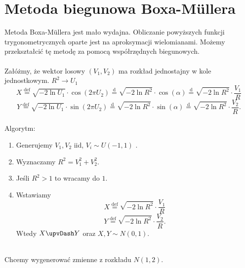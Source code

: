 \documentclass[12pt]{mwart}
\begin{document}
	
	\section{Metoda biegunowa Boxa-Müllera}
	\noindent Metoda Boxa-Müllera jest mało wydajna. Obliczanie powyższych funkcji trygonometrycznych oparte jest na aproksymacji wielomianami. Możemy przekształcić tę metodę za pomocą współrzędnych biegunowych. \\ \\
	\noindent Załóżmy, że wektor losowy $\left( V_{1},V_{2} \right) $ ma rozkład jednostajny w kole jednostkowym.
	$R^{2} \rightarrow U_{1}$
	$$X \overset{\mathrm{def}}{=} \sqrt{-2\ln{U_{1}}} \cdot \cos{\left( 2\pi U_{2} \right) } \overset{\mathrm{d}}{=} \sqrt{-2\ln{R^{2}}} \cdot \cos{\left( \alpha \right) }  \overset{\mathrm{d}}{=} \sqrt{-2\ln{R^{2}}} \cdot \dfrac{V_{1}}{R} $$ 
	$$Y \overset{\mathrm{def}}{=} \sqrt{-2\ln{U_{1}}} \cdot \sin{\left( 2\pi U_{2} \right) \overset{\mathrm{d}}{=} \sqrt{-2\ln{R^{2}}} \cdot \sin{\left( \alpha \right) }  \overset{\mathrm{d}}{=} \sqrt{-2\ln{R^{2}}} \cdot \dfrac{V_{2}}{R}}.$$ \\
	
	\noindent Algorytm:
	\begin{enumerate}
		\item Generujemy $V_{1}, V_{2}$ iid, $V_{i } \sim U \left( -1,1 \right)$ .
		\item Wyznaczamy $R^{2}=V_{1}^{2} + V_{2}^{2}$.
		\item Jeśli $R^{2}>1$ to wracamy do $1$. 
		\item Wstawiamy
		$$X \overset{\mathrm{def}}{=} \sqrt{-2\ln{R^{2}}} \cdot \dfrac{V_{1}}{R}$$ 
		$$Y \overset{\mathrm{def}}{=} \sqrt{-2\ln{R^{2}}} \cdot \dfrac{V_{2}}{R}.$$
		Wtedy $X \upvDash Y$ oraz $X,Y \sim N(0,1)$. \\ \\
	\end{enumerate}
	
	\noindent Chcemy wygenerować zmienne z rozkładu $N(1,2)$.
	
\end{document}
